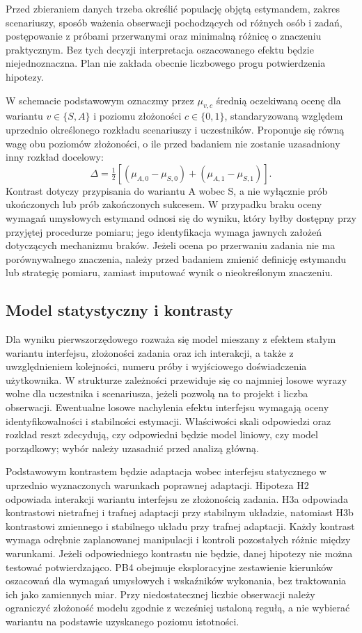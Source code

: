 \documentclass[11pt,a4paper]{article}
\begin{document}
Przed zbieraniem danych trzeba określić populację objętą estymandem, zakres scenariuszy, sposób ważenia obserwacji pochodzących od różnych osób i zadań, postępowanie z próbami przerwanymi oraz minimalną różnicę o znaczeniu praktycznym. Bez tych decyzji interpretacja oszacowanego efektu będzie niejednoznaczna. Plan nie zakłada obecnie liczbowego progu potwierdzenia hipotezy.

W schemacie podstawowym oznaczmy przez $\mu_{v,c}$ średnią oczekiwaną ocenę dla wariantu $v\in\{S,A\}$ i poziomu złożoności $c\in\{0,1\}$, standaryzowaną względem uprzednio określonego rozkładu scenariuszy i uczestników. Proponuje się równą wagę obu poziomów złożoności, o ile przed badaniem nie zostanie uzasadniony inny rozkład docelowy:
\[
\Delta=\tfrac12[(\mu_{A,0}-\mu_{S,0})+
(\mu_{A,1}-\mu_{S,1})].
\]
Kontrast dotyczy przypisania do wariantu A wobec S, a nie wyłącznie prób ukończonych lub prób zakończonych sukcesem. W przypadku braku oceny wymagań umysłowych estymand odnosi się do wyniku, który byłby dostępny przy przyjętej procedurze pomiaru; jego identyfikacja wymaga jawnych założeń dotyczących mechanizmu braków. Jeżeli ocena po przerwaniu zadania nie ma porównywalnego znaczenia, należy przed badaniem zmienić definicję estymandu lub strategię pomiaru, zamiast imputować wynik o nieokreślonym znaczeniu.

\subsection{Model statystyczny i kontrasty}

Dla wyniku pierwszorzędowego rozważa się model mieszany z efektem stałym wariantu interfejsu, złożoności zadania oraz ich interakcji, a także z uwzględnieniem kolejności, numeru próby i wyjściowego doświadczenia użytkownika. W strukturze zależności przewiduje się co najmniej losowe wyrazy wolne dla uczestnika i scenariusza, jeżeli pozwolą na to projekt i liczba obserwacji. Ewentualne losowe nachylenia efektu interfejsu wymagają oceny identyfikowalności i stabilności estymacji. Właściwości skali odpowiedzi oraz rozkład reszt zdecydują, czy odpowiedni będzie model liniowy, czy model porządkowy; wybór należy uzasadnić przed analizą główną.

Podstawowym kontrastem będzie adaptacja wobec interfejsu statycznego w uprzednio wyznaczonych warunkach poprawnej adaptacji. Hipoteza H2 odpowiada interakcji wariantu interfejsu ze złożonością zadania. H3a odpowiada kontrastowi nietrafnej i trafnej adaptacji przy stabilnym układzie, natomiast H3b kontrastowi zmiennego i stabilnego układu przy trafnej adaptacji. Każdy kontrast wymaga odrębnie zaplanowanej manipulacji i kontroli pozostałych różnic między warunkami. Jeżeli odpowiedniego kontrastu nie będzie, danej hipotezy nie można testować potwierdzająco. PB4 obejmuje eksploracyjne zestawienie kierunków oszacowań dla wymagań umysłowych i wskaźników wykonania, bez traktowania ich jako zamiennych miar. Przy niedostatecznej liczbie obserwacji należy ograniczyć złożoność modelu zgodnie z wcześniej ustaloną regułą, a nie wybierać wariantu na podstawie uzyskanego poziomu istotności.
\end{document}
